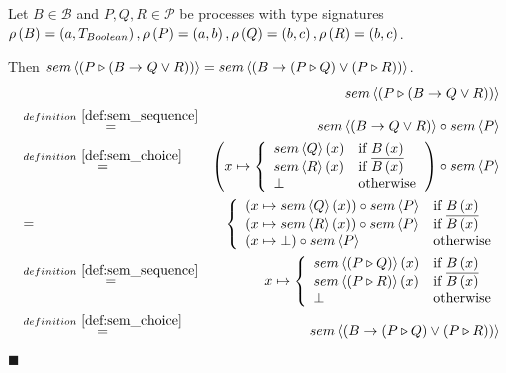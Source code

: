 \begin{myproof}
Let $B \in \mathcal{B}$ and $P, Q, R \in \mathcal{P}$ be processes with type signatures $\rho \left( B \right) = \left( a, T_{Boolean} \right), \rho \left( P \right) = \left( a, b \right), \rho \left( Q \right) = \left( b, c \right), \rho \left( R \right) = \left( b, c \right)$. 

Then $sem \left\langle \left( P \triangleright \left( B \to Q \vee R \right) \right) \right\rangle = sem \left\langle \left( B \to \left( P \triangleright Q \right) \vee \left( P \triangleright R \right) \right) \right\rangle$.
\begin{eqnarray*}
  & & \sem{\sequence{P}{\choice{B}{Q}{R}}} \\
  & \overset{\defref{def:sem_sequence}}{=} & \sem{\choice{B}{Q}{R}} \circ \sem{P} \\
  & \overset{\defref{def:sem_choice}}{=}   & \left( x \mapsto \left\{\begin{array}{ll}
                                                                       \sem{Q} \left( x \right) & \text{if } B \left( x \right) \\
                                                                       \sem{R} \left( x \right) & \text{if } \overline{B \left( x \right)} \\
                                                                       \bot & \text{otherwise}
                                                                     \end{array}
                                                              \right.\right) \circ \sem{P} \\
  & = & \left\{\begin{array}{ll}
                 \left( x \mapsto \sem{Q} \left( x \right) \right) \circ \sem{P} & \text{if } B \left( x \right) \\
                 \left( x \mapsto \sem{R} \left( x \right) \right) \circ \sem{P} & \text{if } \overline{B \left( x \right)} \\
                 \left( x \mapsto \bot \right) \circ \sem{P} & \text{otherwise}
               \end{array}
        \right. \\
  & \overset{\defref{def:sem_sequence}}{=} & x \mapsto \left\{\begin{array}{ll}
                                                                      \sem{\sequence{P}{Q}} \left( x \right) & \text{if } B \left( x \right) \\
                                                                      \sem{\sequence{P}{R}} \left( x \right) & \text{if } \overline{B \left( x \right)} \\
                                                                      \bot & \text{otherwise}
                                                          \end{array}
                                                   \right. \\
  & \overset{\defref{def:sem_choice}}{=}   & \sem{\choice{B}{\sequence{P}{Q}}{\sequence{P}{R}}}
\end{eqnarray*}


\hfill$\blacksquare$
\end{myproof}


